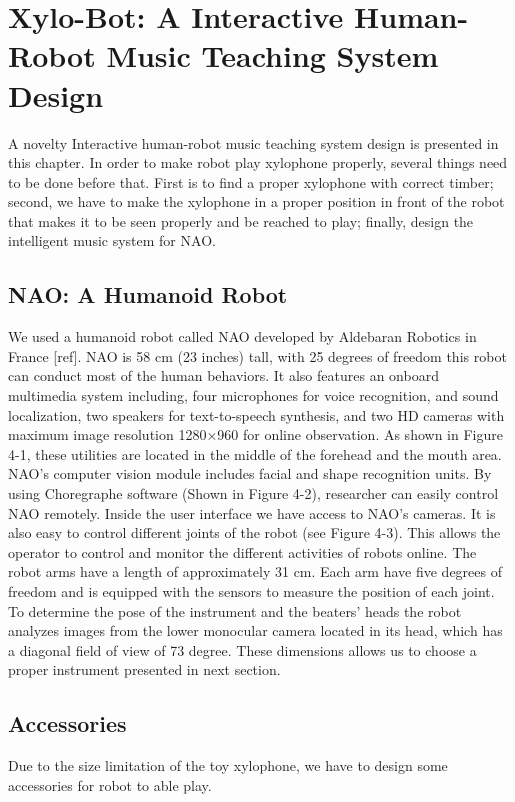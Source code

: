 \chapter{Xylo-Bot: A Interactive Human-Robot Music Teaching System Design} 
A novelty Interactive human-robot music teaching system design is presented in this chapter. In order to make robot play xylophone properly, several things need to be done before that. First is to find a proper xylophone with correct timber; second, we have to make the xylophone in a proper position in front of the robot that makes it to be seen properly and be reached to play; finally, design the intelligent music system for NAO. 

\section{NAO: A Humanoid Robot}
We used a humanoid  robot called NAO developed by Aldebaran Robotics in France [ref]. NAO is 58 cm (23 inches) tall, with 25 degrees of freedom this robot can conduct most of the human behaviors. It also features an onboard multimedia system including, four microphones for voice recognition, and sound localization, two speakers for text-to-speech synthesis, and two HD cameras with maximum image resolution 1280×960 for online observation. As shown in Figure 4-1, these utilities are located in the middle of the forehead and the mouth area. NAO’s computer vision module includes facial and shape recognition units. By using Choregraphe software (Shown  in  Figure 4-2), researcher can easily control NAO remotely. Inside the user interface we have access to NAO’s cameras. It is also easy to control different joints of the robot (see  Figure 4-3). This  allows the operator to control and monitor the different activities of robots online. 
The robot arms have a length of approximately 31 cm. Each arm have five degrees of freedom and is equipped with the sensors to measure the position of each joint. To determine the pose of the instrument and the beaters' heads the robot analyzes images from the lower monocular camera located in its head, which has a diagonal field of view of 73 degree. These dimensions allows us to choose a proper instrument presented in next section.

\section{Accessories}
Due to the size limitation of the toy xylophone, we have to design some accessories for robot to able play.

